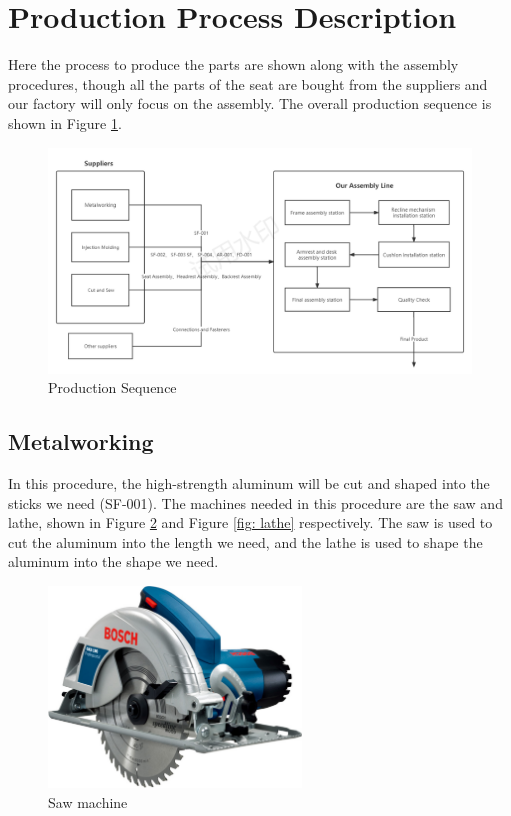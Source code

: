 \section{Production Process Description} \label{sec:ProdProc}

Here the process to produce the parts are shown along with the assembly procedures, though all the parts of the seat are bought from the suppliers and our factory will only focus on the assembly. The overall production sequence is shown in Figure \ref{fig:ProdSeq}.

\begin{figure}[!htp]
    \centering
    \includegraphics[width=\textwidth]{images/production sequence.png}
    \caption{Production Sequence}
    \label{fig:ProdSeq}
\end{figure}

\subsection{Metalworking}
In this procedure, the high-strength aluminum will be cut and shaped into the sticks we need (SF-001). The machines needed in this procedure are the saw and lathe, shown in Figure \ref{fig: saw} and Figure \ref{fig: lathe} respectively. The saw is used to cut the aluminum into the length we need, and the lathe is used to shape the aluminum into the shape we need. 

\begin{figure}[!htp]
    \centering
    \includegraphics[width=0.6\textwidth]{images/saw.jpg}
    \caption{Saw machine}
    \label{fig: saw}
\end{figure}

